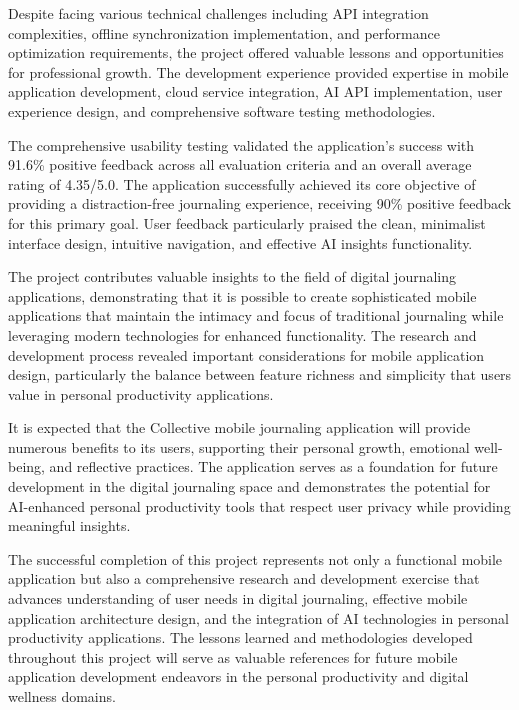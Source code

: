 Despite facing various technical challenges including API integration complexities, offline synchronization implementation, and performance optimization requirements, the project offered valuable lessons and opportunities for professional growth. The development experience provided expertise in mobile application development, cloud service integration, AI API implementation, user experience design, and comprehensive software testing methodologies.

The comprehensive usability testing validated the application's success with 91.6\% positive feedback across all evaluation criteria and an overall average rating of 4.35/5.0. The application successfully achieved its core objective of providing a distraction-free journaling experience, receiving 90\% positive feedback for this primary goal. User feedback particularly praised the clean, minimalist interface design, intuitive navigation, and effective AI insights functionality.

The project contributes valuable insights to the field of digital journaling applications, demonstrating that it is possible to create sophisticated mobile applications that maintain the intimacy and focus of traditional journaling while leveraging modern technologies for enhanced functionality. The research and development process revealed important considerations for mobile application design, particularly the balance between feature richness and simplicity that users value in personal productivity applications.

It is expected that the Collective mobile journaling application will provide numerous benefits to its users, supporting their personal growth, emotional well-being, and reflective practices. The application serves as a foundation for future development in the digital journaling space and demonstrates the potential for AI-enhanced personal productivity tools that respect user privacy while providing meaningful insights.

The successful completion of this project represents not only a functional mobile application but also a comprehensive research and development exercise that advances understanding of user needs in digital journaling, effective mobile application architecture design, and the integration of AI technologies in personal productivity applications. The lessons learned and methodologies developed throughout this project will serve as valuable references for future mobile application development endeavors in the personal productivity and digital wellness domains.